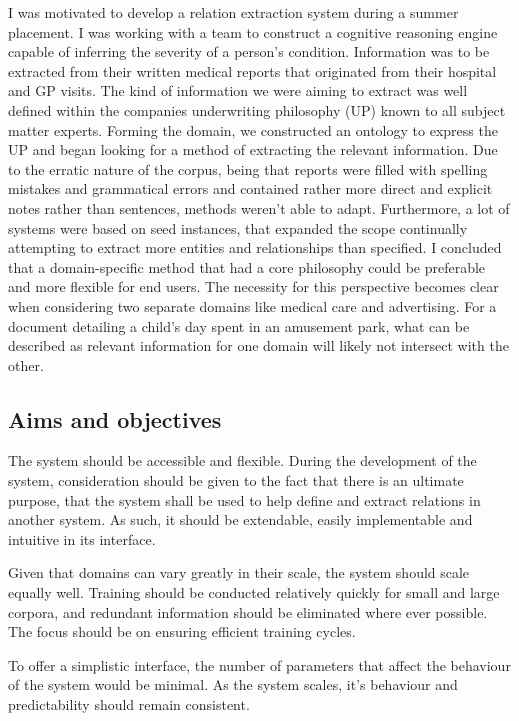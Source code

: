 \documentclass[11pt]{article} %
\begin{document}
I was motivated to develop a relation extraction system during a summer placement. I was working with a team to construct a cognitive reasoning engine capable of inferring the severity of a person’s condition. Information was to be extracted from their written medical reports that originated from their hospital and GP visits. The kind of information we were aiming to extract was well defined within the companies underwriting philosophy (UP) known to all subject matter experts. Forming the domain, we constructed an ontology to express the UP and began looking for a method of extracting the relevant information. Due to the erratic nature of the corpus, being that reports were filled with spelling mistakes and grammatical errors and contained rather more direct and explicit notes rather than sentences, methods weren’t able to adapt. Furthermore, a lot of systems were based on seed instances, that expanded the scope continually attempting to extract more entities and relationships than specified. I concluded that a domain-specific method that had a core philosophy could be preferable and more flexible for end users. The necessity for this perspective becomes clear when considering two separate domains like medical care and advertising. For a document detailing a child’s day spent in an amusement park, what can be described as relevant information for one domain will likely not intersect with the other. 

\subsection{Aims and objectives}

The system should be accessible and flexible. During the development of the system, consideration should be given to the fact that there is an ultimate purpose, that the system shall be used to help define and extract relations in another system. As such, it should be extendable, easily implementable and intuitive in its interface.

Given that domains can vary greatly in their scale, the system should scale equally well. Training should be conducted relatively quickly for small and large corpora, and redundant information should be eliminated where ever possible. The focus should be on ensuring efficient training cycles.

To offer a simplistic interface, the number of parameters that affect the behaviour of the system would be minimal. As the system scales, it’s behaviour and predictability should remain consistent.
\end{document}
